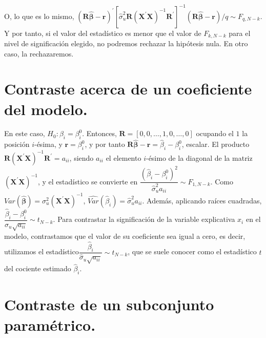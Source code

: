 O, lo que es lo mismo, $\left(\boldsymbol{R}\hat{\boldsymbol{\beta}}-\boldsymbol{r}\right)^{\prime}\left[\hat{\sigma}_{u}^{2}\boldsymbol{R}\left(\boldsymbol{X}^{\prime}\boldsymbol{X}\right)^{-1}\boldsymbol{R}^{\prime}\right]^{-1}\left(\boldsymbol{R}\hat{\boldsymbol{\beta}}-\boldsymbol{r}\right)/q\sim F_{q,N-k}$.
Y por tanto, si el valor del estad\'istico es menor que el valor de
$F_{k,N-k}$ para el nivel de significaci\'on elegido, no podremos rechazar
la hip\'otesis nula. En otro caso, la rechazaremos.


\section{Contraste acerca de un coeficiente del modelo.}

En este caso, $H_{0}:\beta_{i}=\beta_{i}^{0}$. Entonces, $\boldsymbol{R}=\left[0,0,\ldots,1,0,\ldots,0\right]$
ocupando el $1$ la posici\'on $i$-\'esima, y $\boldsymbol{r}=\beta_{i}^{0}$,
y por tanto $\boldsymbol{R}\hat{\boldsymbol{\beta}}-\boldsymbol{r}=\hat{\beta}_{i}-\beta_{i}^{0}$,
escalar. El producto $\boldsymbol{R}\left(\boldsymbol{X}^{\prime}\boldsymbol{X}\right)^{-1}\boldsymbol{R}^{\prime}=a_{ii}$,
siendo $a_{ii}$ el elemento $i$-\'esimo de la diagonal de la matriz
$\left(\boldsymbol{X}^{\prime}\boldsymbol{X}\right)^{-1}$, y el estad\'istico
se convierte en $\dfrac{\left(\hat{\beta}_{i}-\beta_{i}^{0}\right)^{2}}{\hat{\sigma}_{u}^{2}a_{ii}}\sim F_{1,N-k}$.
Como $Var(\hat{\boldsymbol{\beta}})=\sigma_{u}^{2}\left(\boldsymbol{X}^{\prime}\boldsymbol{X}\right)^{-1}$,
$\hat{Var}(\hat{\beta}_{i})=\hat{\sigma}_{u}^{2}a_{ii}$. Adem\'as,
aplicando ra\'ices cuadradas, $\dfrac{\hat{\beta}_{i}-\beta_{i}^{0}}{\hat{\sigma}_{u}\sqrt{a_{ii}}}\sim t_{N-k}$.
Para contrastar la significaci\'on de la variable explicativa $x_{i}$
en el modelo, contrastamos que el valor de su coeficiente sea igual
a cero, es decir, utilizamos el estad\'istico$\dfrac{\hat{\beta}_{i}}{\hat{\sigma}_{u}\sqrt{a_{ii}}}\sim t_{N-k}$,
que se suele conocer como el estad\'istico $t$ del cociente estimado
$\hat{\beta}_{i}$.


\section{Contraste de un subconjunto param\'etrico.}

